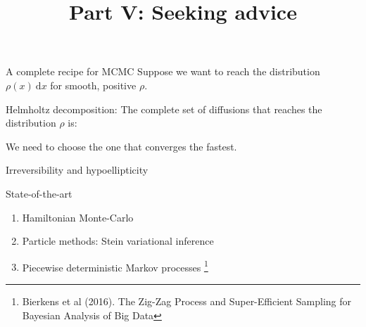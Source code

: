 \documentclass{beamer}
\renewcommand{\d}{\: \mathrm{d}}
\begin{document}
\begin{frame}{A complete recipe for MCMC}
    Suppose we want to reach the distribution $\rho(x) \d x$ for smooth, positive $\rho$.
    
    Helmholtz decomposition: The complete set of diffusions that reaches the distribution $\rho$ is:
    
    We need to choose the one that converges the fastest.
\end{frame}

\begin{frame}{Irreversibility and hypoellipticity}
\end{frame}

\begin{frame}{State-of-the-art}
\begin{enumerate}
    \item Hamiltonian Monte-Carlo
    \item Particle methods: Stein variational inference
    \item Piecewise deterministic Markov processes \footnote{Bierkens et al (2016). The Zig-Zag Process and Super-Efficient Sampling for Bayesian Analysis of Big Data}
\end{enumerate}
\end{frame}

\begin{frame}
\title{Part V: Seeking advice}
\author{\vspace{-5ex}}
\institute{\vspace{-5ex}}
\date{\vspace{-5ex}}
    \maketitle
    \small
\end{frame}
\end{document}
